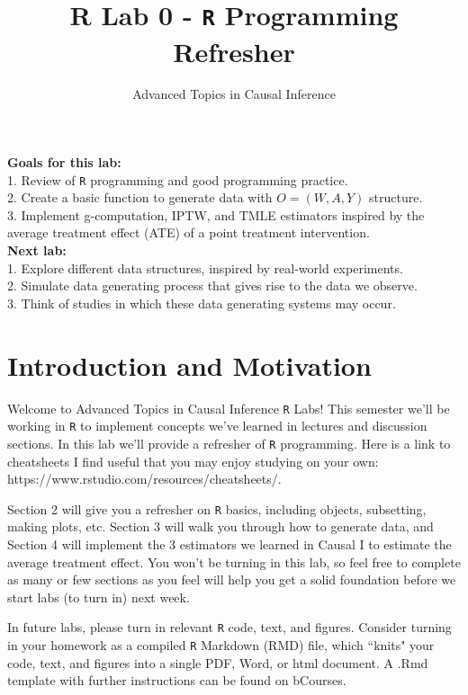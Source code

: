 \documentclass[answers]{exam}
\title{R Lab 0 - \texttt{R} Programming Refresher}
\author{Advanced Topics in Causal Inference}
\date{}
\begin{document}

\maketitle



\noindent \textbf{Goals for this lab:} \\ 
1. Review of \texttt{R} programming and good programming practice. \\
2. Create a basic function to generate data with $O = (W, A, Y)$ structure. \\
3. Implement g-computation, IPTW, and TMLE estimators inspired by the average treatment effect (ATE) of a point treatment intervention. \\

\noindent \textbf{Next lab:} \\
1. Explore different data structures, inspired by real-world experiments. \\
2. Simulate data generating process that gives rise to the data we observe. \\
3. Think of studies in which these data generating systems may occur.\\

\section{Introduction and Motivation}

Welcome to Advanced Topics in Causal Inference \texttt{R} Labs! This semester we'll be working in \texttt{R} to implement concepts we've learned in lectures and discussion sections. In this lab we'll provide a refresher of \texttt{R} programming. Here is a link to cheatsheets I find useful that you may enjoy studying on your own: https://www.rstudio.com/resources/cheatsheets/.

\noindent Section 2 will give you a refresher on \texttt{R} basics, including objects, subsetting, making plots, etc. Section 3 will walk you through how to generate data, and Section 4 will implement the 3 estimators we learned in Causal I to estimate the average treatment effect. You won't be turning in this lab, so feel free to complete as many or few sections as you feel will help you get a solid foundation before we start labs (to turn in) next week.

\noindent In future labs, please turn in relevant \texttt{R} code, text, and figures. Consider turning in your homework as a compiled \texttt{R} Markdown (RMD) file, which ``knits" your code, text, and figures into a single PDF, Word, or html document. A .Rmd template with further instructions can be found on bCourses.
\end{document}
